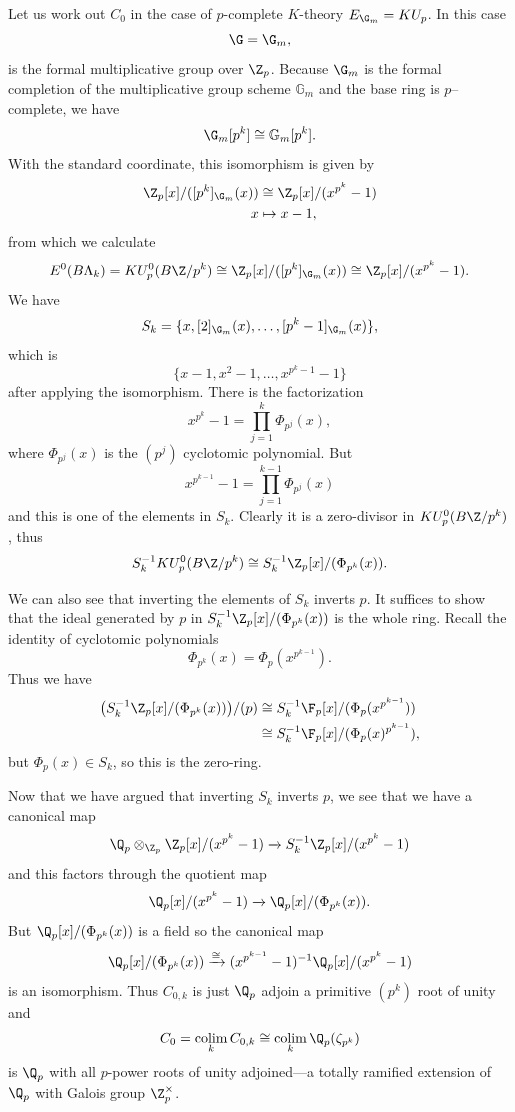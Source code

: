 \begin{example} \label{padicktheory}
Let us work out \(C_0\) in the case of $p$-complete $K$-theory \(E_{\G_m} = KU_p\).
In this case 
\[
\G = \G_m,
\]
is the formal multiplicative group over \(\Z_p\).
Because \(\G_m\) is the formal completion of the multiplicative group scheme \(\mathbb G_m\) and the base ring is \(p\)--complete, we have
\[
\G_m[p^k] \cong \mathbb{G}_m[p^k].
\]
With the standard coordinate, this isomorphism is given by
\begin{align*}
\Z_p[x]/([p^k]_{\G_m}(x)) & \cong \Z_p[x]/(x^{p^k}-1) \\
x & \mapsto x-1,
\end{align*}
from which we calculate 
\[
E^0(B\Lk) = KU_{p}^0(B\Z/p^k) \cong \Z_p[x]/([p^k]_{\G_m}(x)) \cong \Z_p[x]/(x^{p^k}-1).
\]
We have
\[
S_k = \{x,[2]_{\G_m}(x),\ldots, [p^k-1]_{\G_m}(x)\},
\]
which is
\[
\{x-1,x^2-1, \ldots, x^{p^k-1}-1\}
\]
after applying the isomorphism.
There is the factorization
\[
x^{p^k}-1 = \prod_{j=1}^k \Phi_{p^j}(x),
\]
where \(\Phi_{p^j}(x)\) is the \((p^j)\){\th} cyclotomic polynomial.
But
\[
x^{p^{k-1}}-1 = \prod_{j=1}^{k-1} \Phi_{p^j}(x)
\]
and this is one of the elements in \(S_k\).
Clearly it is a zero-divisor in \(KU_{p}^0(B\Z/p^k)\), thus
\[
S_{k}^{-1}KU_{p}^0(B\Z/p^k) \cong S_{k}^{-1}\Z_p[x]/(\Phi_{p^k}(x)).
\]

We can also see that inverting the elements of \(S_{k}\) inverts \(p\).
It suffices to show that the ideal generated by \(p\) in \(S_{k}^{-1}\Z_p[x]/(\Phi_{p^k}(x))\) is the whole ring.
Recall the identity of cyclotomic polynomials 
\[
\Phi_{p^k}(x) = \Phi_p(x^{p^{k-1}}).
\]
Thus we have
\begin{align*}
\big ( S_{k}^{-1}\Z_p[x]/(\Phi_{p^k}(x)) \big )/(p)
& \cong S_{k}^{-1}\F_p[x]/(\Phi_{p}(x^{p^{k-1}})) \\
& \cong S_{k}^{-1}\F_p[x]/(\Phi_{p}(x)^{p^{k-1}}),
\end{align*}
but \(\Phi_{p}(x) \in S_k\), so this is the zero-ring.

Now that we have argued that inverting \(S_k\) inverts \(p\), we see that we have a canonical map
\[
\Q_p \otimes_{\Z_p} \Z_p[x]/(x^{p^k}-1) \xrightarrow{} S_{k}^{-1}\Z_p[x]/(x^{p^k}-1) 
\]
and this factors through the quotient map
\[
\Q_p[x]/(x^{p^k}-1) \xrightarrow{} \Q_p[x]/(\Phi_{p^k}(x)).
\]
But \(\Q_p[x]/(\Phi_{p^k}(x))\) is a field so the canonical map
\[
\Q_p[x]/(\Phi_{p^k}(x)) \xrightarrow{\cong} (x^{p^{k-1}}-1)^{-1}\Q_p[x]/(x^{p^k}-1)
\]
is an isomorphism.
Thus \(C_{0,k}\) is just \(\Q_p\) adjoin a primitive \((p^k)\){\th} root of unity and
\[
C_0 = \colim_k C_{0,k} \cong \colim_k \Q_p(\zeta_{p^k})
\]
is \(\Q_p\) with all \(p\)-power roots of unity adjoined---a totally ramified extension of \(\Q_p\) with Galois group \(\Z_{p}^{\times}\).
\end{example}

